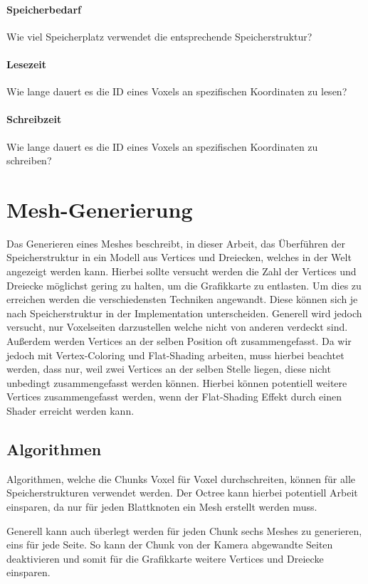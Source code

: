 \documentclass[
a4paper,     %
12pt         %
]{scrartcl}  %
\begin{document}
\paragraph{Speicherbedarf}
Wie viel Speicherplatz verwendet die entsprechende Speicherstruktur?

\paragraph{Lesezeit}
Wie lange dauert es die ID eines Voxels an spezifischen Koordinaten zu lesen?

\paragraph{Schreibzeit}
Wie lange dauert es die ID eines Voxels an spezifischen Koordinaten zu schreiben?

\section{Mesh-Generierung}
Das Generieren eines Meshes beschreibt, in dieser Arbeit, das Überführen der Speicherstruktur in ein Modell aus Vertices und Dreiecken, welches in der Welt angezeigt werden kann. Hierbei sollte versucht werden die Zahl der Vertices und Dreiecke möglichst gering zu halten, um die Grafikkarte zu entlasten. Um dies zu erreichen werden die verschiedensten Techniken angewandt. Diese können sich je nach Speicherstruktur in der Implementation unterscheiden. Generell wird jedoch versucht, nur Voxelseiten darzustellen welche nicht von anderen verdeckt sind. Außerdem werden Vertices an der selben Position oft zusammengefasst. Da wir jedoch mit Vertex-Coloring und Flat-Shading arbeiten, muss hierbei beachtet werden, dass nur, weil zwei Vertices an der selben Stelle liegen, diese nicht unbedingt zusammengefasst werden können. Hierbei können potentiell weitere Vertices zusammengefasst werden, wenn der Flat-Shading Effekt durch einen Shader erreicht werden kann.

\subsection{Algorithmen}
Algorithmen, welche die Chunks Voxel für Voxel durchschreiten, können für alle Speicherstrukturen verwendet werden. Der Octree kann hierbei potentiell Arbeit einsparen, da nur für jeden Blattknoten ein Mesh erstellt werden muss.

Generell kann auch überlegt werden für jeden Chunk sechs Meshes zu generieren,  eins für jede Seite. So kann der Chunk von der Kamera abgewandte Seiten deaktivieren und somit für die Grafikkarte weitere Vertices und Dreiecke einsparen.
\end{document}
